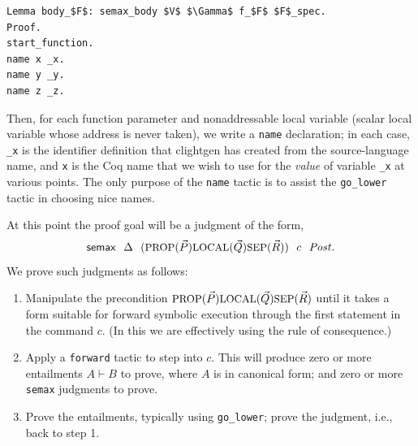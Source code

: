 \documentclass[12pt,fleqn,openany,oneside,showtrims]{memoir}
\begin{document}
\begin{lstlisting}
Lemma body_$F$: semax_body $V$ $\Gamma$ f_$F$ $F$_spec.
Proof.
start_function.
name x _x.
name y _y.
name z _z.
\end{lstlisting}

Then, for each function parameter and nonaddressable local variable 
(scalar local variable whose address is never taken), we write a
\lstinline{name} declaration; in each case, \lstinline{_x} is the
identifier definition that clightgen has created from the source-language
name, and \lstinline{x} is the Coq name that we wish to use for
the \emph{value} of variable \lstinline{_x} at various points.
The only purpose of the \lstinline{name}
tactic is to assist the \lstinline{go_lower} tactic in choosing nice names.

At this point the proof goal will be a judgment of the form,
\[
\mathsf{semax}~~\Delta~~(\mbox{\small PROP}(\vec{P}) \mbox{\small LOCAL}(\vec{Q}) \mbox{\small SEP}(\vec{R}))~~c~~\mathit{Post}.
\]
We prove such judgments as follows:
\begin{enumerate}
\item Manipulate the precondition 
$\mbox{\small PROP}(\vec{P}) \mbox{\small LOCAL}(\vec{Q}) \mbox{\small SEP}(\vec{R})$
until it takes a form suitable for forward symbolic execution
through the first statement in the command $c$.  (In this we are
effectively using the rule of consequence.)
\item Apply a \lstinline{forward} tactic to step into $c$.
This will produce zero or more entailments $A\vdash B$ to prove,
where $A$ is in canonical form; 
and zero or more 
\lstinline{semax} judgments to prove.
\item Prove the entailments, typically using \lstinline{go_lower};
prove the judgment, i.e., back to step 1.
\end{enumerate}
\end{document}
